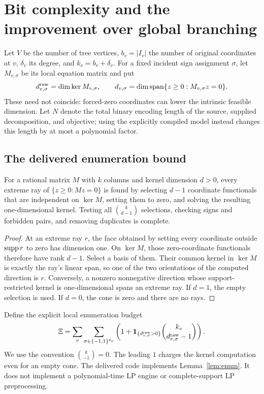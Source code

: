 \section{Bit complexity and the improvement over global branching}
\label{sec:complexity}

Let $V$ be the number of tree vertices, $b_v=|I_v|$ the number of original
coordinates at $v$, $\delta_v$ its degree, and $k_v=b_v+\delta_v$. For a fixed
incident sign assignment $\sigma$, let $M_{v,\sigma}$ be its local equation
matrix and put
\[
 d^{\rm raw}_{v,\sigma}=\dim\ker M_{v,\sigma},\qquad
 d_{v,\sigma}=\dim\operatorname{span}
       \{z\geq0:M_{v,\sigma}z=0\}.
\]
These need not coincide: forced-zero coordinates can lower the intrinsic
feasible dimension. Let $N$ denote the total binary encoding length of the
source, supplied decomposition, and objective; using the explicitly compiled
model instead changes this length by at most a polynomial factor.

\subsection{The delivered enumeration bound}

\begin{lemma}
\label{lem:enum}
For a rational matrix $M$ with $k$ columns and kernel dimension $d>0$, every
extreme ray of $\{z\geq0:Mz=0\}$ is found by selecting $d-1$ coordinate
functionals that are independent on $\ker M$, setting them to zero, and solving
the resulting one-dimensional kernel. Testing all $\binom{k}{d-1}$ selections,
checking signs and forbidden pairs, and removing duplicates is complete.
\end{lemma}

\begin{proof}
At an extreme ray $r$, the face obtained by setting every coordinate outside
$\operatorname{supp} r$ to zero has dimension one. On $\ker M$, those zero-coordinate
functionals therefore have rank $d-1$. Select a basis of them. Their common
kernel in $\ker M$ is exactly the ray's linear span, so one of the two
orientations of the computed direction is $r$. Conversely, a nonzero
nonnegative direction whose support-restricted kernel is one-dimensional
spans an extreme ray. If $d=1$, the empty selection is used. If $d=0$, the cone
is zero and there are no rays.
\end{proof}

Define the explicit local enumeration budget
\begin{equation}\label{eq:Xi}
 \Xi=\sum_v\sum_{\sigma\in\{-1,1\}^{\delta_v}}
 \left(1+\mathbf1_{\{d^{\rm raw}_{v,\sigma}>0\}}
 \binom{k_v}{d^{\rm raw}_{v,\sigma}-1}\right).
\end{equation}
We use the convention $\binom{k}{-1}=0$. The leading $1$ charges the kernel
computation even for an empty cone.
The delivered code implements Lemma~\ref{lem:enum}. It does not implement a
polynomial-time LP engine or complete-support LP preprocessing.

